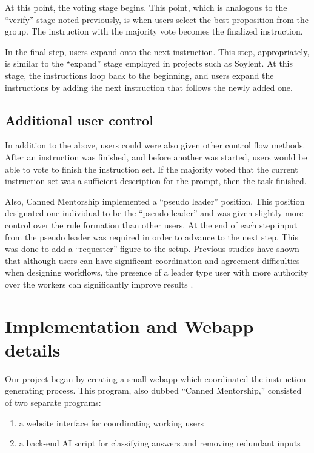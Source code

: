 At this point, the voting stage begins. 
This point, which is analogous to the ``verify'' stage noted previously, is when users select the best proposition from the group.
The instruction with the majority vote becomes the finalized instruction.

In the final step, users expand onto the next instruction. 
This step, appropriately, is similar to the ``expand'' stage employed in projects such as Soylent. 
At this stage, the instructions loop back to the beginning, and users expand the instructions by adding the next instruction that follows the newly added one.

\subsection{Additional user control}
In addition to the above, users could were also given other control flow methods. 
After an instruction was finished, and before another was started, users would be able to vote to finish the instruction set. 
If the majority voted that the current instruction set was a sufficient description for the prompt, then the task finished.

Also, Canned Mentorship implemented a ``pseudo leader'' position.
This position designated one individual to be the ``pseudo-leader'' and was given slightly more control over the rule formation than other users.
At the end of each step input from the pseudo leader was required in order to advance to the next step.
This was done to add a ``requester'' figure to the setup. 
Previous studies have shown that although users can have significant coordination and agreement difficulties when designing workflows, the presence of a leader type user with more authority over the workers can significantly improve results \cite{kulkarni2012collaboratively}.

\section{Implementation and Webapp details}
Our project began by creating a small webapp which coordinated the instruction generating process.
This program, also dubbed ``Canned Mentorship,'' consisted of two separate programs:

\begin{enumerate}
	\item a website interface for coordinating working users
	\item a back-end AI script for classifying answers and removing redundant inputs
\end{enumerate}

